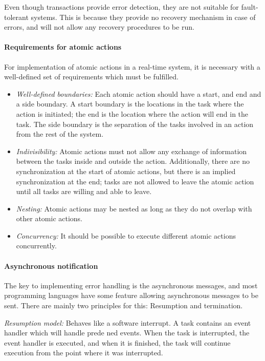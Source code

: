 Even though transactions provide error detection, they are not suitable for fault-tolerant systems. This is because they provide no recovery mechanism in case of errors, and will not allow any recovery procedures to be run.


\paragraph{Requirements for atomic actions} For implementation of atomic actions in a real-time system, it is necessary with a well-defined set of requirements which must be fulfilled.
\begin{itemize}
  \item \textit{Well-defined boundaries:} Each atomic action should have a start, and end and a side boundary. A start boundary is the locations in the task where the action is initiated; the end is the location where the action will end in the task. The side boundary is the separation of the tasks involved in an action from the rest of the system.
  \item \textit{Indivisibility:} Atomic actions must not allow any exchange of information between the tasks inside and outside the action. Additionally, there are no synchronization at the start of atomic actions, but there is an implied synchronization at the end; tasks are not allowed to leave the atomic action until all tasks are willing and able to leave.
  \item \textit{Nesting:} Atomic actions may be nested as long as they do not overlap with other atomic actions.
  \item \textit{Concurrency:} It should be possible to execute different atomic actions concurrently.
\end{itemize}

\paragraph{Asynchronous notification} The key to implementing error handling is the asynchronous messages, and most programming languages have some feature allowing asynchronous messages to be sent. There are mainly two principles for this: Resumption and termination.

\textit{Resumption model:} Behaves like a software interrupt. A task contains an event handler which will handle prede ned events. When the task is interrupted, the event handler is executed, and when it is finished, the task will continue execution from the point where it was interrupted.

